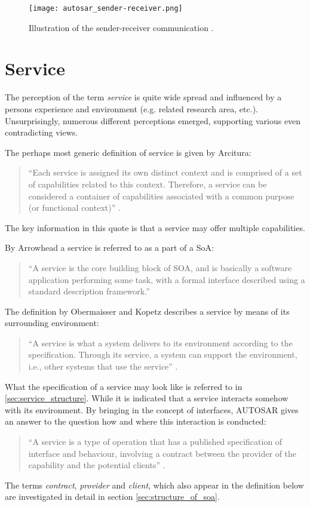 \begin{figure}[!htbp]
\centering
\texttt{[image: autosar\_sender-receiver.png]}
\caption{Illustration of the sender-receiver communication \cite{autosar_intro}.}
\label{fig:autosar_sender-receiver}
\end{figure}










\section{Service}
\label{ch:service} 
The perception of the term \emph{service} is quite wide spread and influenced by a persons experience and environment (e.g. related research area, etc.). Unsurprisingly, numerous different perceptions emerged, supporting various even contradicting views.

The perhaps most generic definition of service is given by Arcitura:
\begin{quote}
``Each service is assigned its own distinct context and is comprised of a set of capabilities related to this context. Therefore, a service can be considered a container of capabilities associated with a common purpose (or functional context)'' \cite{arcitura}.
\end{quote}
The key information in this quote is that a service may offer multiple capabilities.

By Arrowhead a service is referred to as a part of a SoA:
\begin{quote}
``A service is the core building block of SOA, and is basically a software application performing some task, with a formal interface described using a standard description framework.'' \cite{arrowhead}
\end{quote}

The definition by Obermaisser and Kopetz describes a service by means of its surrounding environment:
\begin{quote}
``A service is what a system delivers to its environment according to the specification. Through its service, a system can support the environment, i.e., other systems that use the service'' \cite[p.8]{genesys}.
\end{quote}
What the specification of a service may look like is referred to in \ref{sec:service_structure}. While it is indicated that a service interacts somehow with its environment. By bringing in the concept of interfaces, AUTOSAR gives an answer to the question how and where this interaction is conducted:
\begin{quote}
``A service is a type of operation that has a published specification of interface and behaviour, involving a contract between the provider of the capability and the potential clients'' \cite{autosar_glossary}.
\end{quote}
The terms \emph{contract}, \emph{provider} and \emph{client}, which also appear in the definition below are investigated in detail in section \ref{sec:structure_of_soa}.

